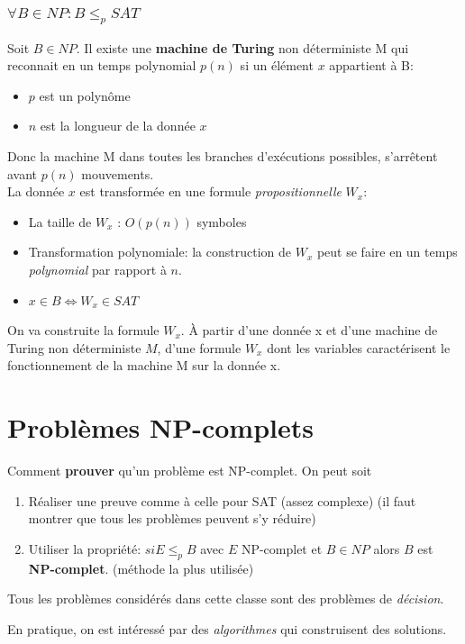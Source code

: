 \documentclass{report}
\begin{document}
\subsubsection{$\forall B \in NP : B \leqslant_p SAT$}
Soit $B \in NP$. Il existe une \textbf{machine de Turing} non déterministe M qui reconnait en un temps polynomial $p(n)$ si un élément $x$ appartient à B:
\begin{itemize}
\item $p$ est un polynôme 
\item $n$ est la longueur de la donnée $x$
\end{itemize}
Donc la machine M dans toutes les branches d'exécutions possibles, s'arrêtent avant $p(n)$ mouvements.\\
La donnée $x$ est transformée en une formule \textit{propositionnelle} $W_x$:
\begin{itemize}
\item La taille de $W_x$ : $O(p(n))$ symboles
\item Transformation polynomiale: la construction de $W_x$ peut se faire en un temps \textit{polynomial} par rapport à $n$.
\item $x \in B \Leftrightarrow W_x \in SAT$
\end{itemize}

On va construite la formule $W_x$. À partir d'une donnée x et d'une machine de Turing non déterministe $M$, d'une formule $W_x$ dont les variables caractérisent le fonctionnement de la machine M sur la donnée x.

\section{Problèmes NP-complets}
Comment \textbf{prouver} qu'un problème est NP-complet. On peut soit
\begin{enumerate}
\item Réaliser une preuve comme à celle pour SAT (assez complexe) (il faut montrer que tous les problèmes peuvent s'y réduire)
\item Utiliser la propriété: $si E \leqslant_p B$ avec $E$ NP-complet et $B \in NP$ alors $B$ est \textbf{NP-complet}. (méthode la plus utilisée)
\end{enumerate}
Tous les problèmes considérés dans cette classe sont des problèmes de \textit{décision}.\par 
En pratique, on est intéressé par des \textit{algorithmes} qui construisent des solutions.\par 
\end{document}

